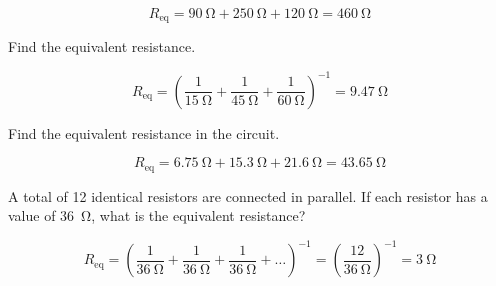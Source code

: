 \documentclass[answers]{exam}
\begin{document}
\begin{questions}
\begin{solution}

\begin{equation*}
    R_\text{eq} = \SI{90}{\ohm} + \SI{250}{\ohm} + \SI{120}{\ohm} = \boxed{\SI{460}{\ohm}}    
\end{equation*}
\end{solution}


\question
Find the equivalent resistance.

\begin{center}
\end{center}

\begin{solution}

\begin{equation*}
    R_\text{eq} = \left(\frac{1}{\SI{15}{\ohm}} + \frac{1}{\SI{45}{\ohm}} + \frac{1}{\SI{60}{\ohm}}\right)^{-1} = \boxed{\SI{9.47}{\ohm}}    
\end{equation*}
\end{solution}


\question
Find the equivalent resistance in the circuit.

\begin{center}
\end{center}


\begin{solution}
\begin{equation*}
    R_\mathrm{eq} = \SI{6.75}{\ohm} + \SI{15.3}{\ohm} + \SI{21.6}{\ohm} = \boxed{\SI{43.65}{\ohm}}
\end{equation*}
\end{solution}

\question
A total of 12 identical resistors are connected in parallel. If each resistor has a value of \SI{36}{\ohm}, what is the equivalent resistance?

\begin{solution}

\begin{equation*}
    R_\text{eq} = \left(\frac{1}{\SI{36}{\ohm}} + \frac{1}{\SI{36}{\ohm}} + \frac{1}{\SI{36}{\ohm}} + \ldots\right)^{-1} = \left(\frac{12}{\SI{36}{\ohm}}\right)^{-1} = \boxed{\SI{3}{\ohm}}    
\end{equation*}
\end{solution}





\end{questions}
\end{document}
